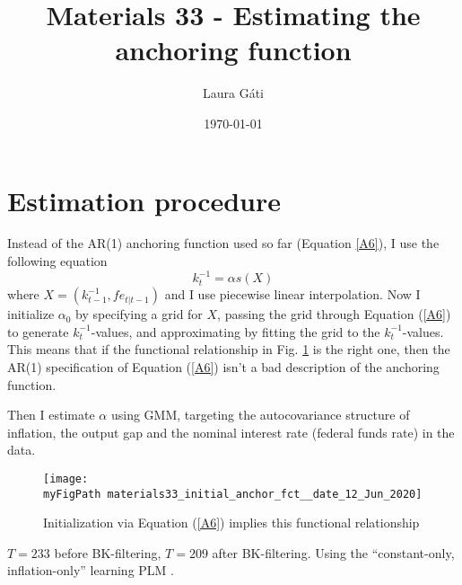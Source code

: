 \documentclass[11pt]{article}
\def \myFigPath {../../figures/}
\renewcommand{\[}{\begin{equation}}
\renewcommand{\]}{\end{equation}}
\begin{document}
\linespread{1.0}

\title{Materials 33 - Estimating the anchoring function}
\author{Laura G\'ati} 
\date{\today}
\maketitle




\section{Estimation procedure}
Instead of the AR(1) anchoring function used so far (Equation \ref{A6}), I use the following equation
\begin{equation}
k_t^{-1} = \alpha s(X)
\end{equation}
where $X = (k^{-1}_{t-1}, fe_{t|t-1})$ and I use piecewise linear interpolation. Now I initialize $\alpha_0$ by specifying a grid for $X$, passing the grid through Equation (\ref{A6}) to generate $k^{-1}_t$-values, and approximating by fitting the grid to the $k^{-1}_t$-values. This means that if the functional relationship in Fig. \ref{fig_initial_anchor_fct} is the right one, then the AR(1) specification of Equation (\ref{A6}) isn't a bad description of the anchoring function.

Then I estimate $\alpha$ using GMM, targeting the autocovariance structure of inflation, the output gap and the nominal interest rate (federal funds rate) in the data. 

\begin{figure}[h!]
\texttt{[image: \\myFigPath materials33\_initial\_anchor\_fct\_\_date\_12\_Jun\_2020]}
\caption{Initialization via Equation (\ref{A6}) implies this functional relationship}
\label{fig_initial_anchor_fct}
\end{figure}

$T=233$ before BK-filtering, $T=209$ after BK-filtering. Using the ``constant-only, inflation-only'' learning PLM .
\end{document}

